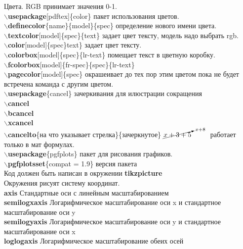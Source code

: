 \documentclass{article}
\newcommand{\bs}{$\backslash$}
\newcommand{\bd}[1]{{\bfseries #1}} %
\newcommand{\bb}[1]{\bd{\bs #1}} %
\begin{document}
Цвета. RGB принимает значения 0-1.\\
\bb{usepackage}[pdftex]\{color\} пакет использования цветов.\\
\bb{definecolor}\{name\}\{model\}\{spec\} определение нового имени цвета.\\
\bb{textcolor}[model]\{spec\}\{text\}
\textcolor[rgb]{1,0,0}{задает цвет тексту, модель надо выбрать rgb.}\\
{\bb{color}[model]\{spec\}text\} {\color[rgb]{0,1,0}задает цвет тексту.}\\
\bb{colorbox}[model]\{spec\}\{lr-text\}
\colorbox[rgb]{0,0,1}{помещает текст в цветную коробку.}\\
\bb{fcolorbox}[model]\{fr-spec\}\{spec\}\{lr-text\}
\\
\bb{pagecolor}[model]\{spec\} окрашеивает до тех пор этим цветом
пока не будет встречена команда с другим цветом.\\

\bb{usepackage}\{cancel\} зачеркивания для илюстрации сокращения\\
\bb{cancel} \\
\bb{bcancel} \\
\bb{xcancel} \\
\bb{cancelto}\{на что указывает стрелка\}\{зачеркнутое\}
$\cancelto{x+8}{x+3+5}$ ~~~~ работает только в мат формулах.\\

\bb{usepackage}\{pgfplots\} пакет для рисования графиков.\\
\bb{pgfplotsset}\{compat = 1.9\} версия пакета\\
Код должен быть написан в окружении \bd{tikzpicture}\\
Окружения рисуят систему координат.\\
\bd{axis} Стандартные оси с линейным масштабированием\\
\bd{semilogxaxis} Логарифмическое масштабирование оси x
и стандартное масштабирование оси y\\
\bd{semilogyaxis} Логарифмическое масштабирование оси y
и стандартное масштабирование оси x\\
\bd{loglogaxis} Логарифмическое масштабирование обеих осей\\

}
\end{document}
